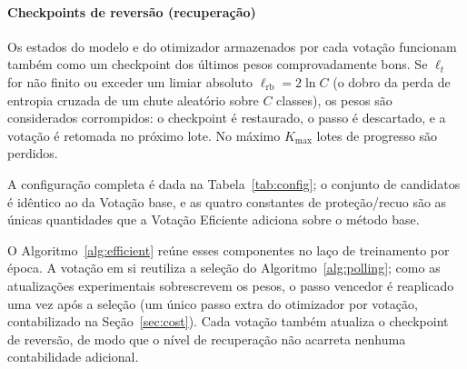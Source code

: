 \documentclass[conference]{IEEEtran}
\begin{document}
\paragraph{Checkpoints de reversão (recuperação)} Os estados do modelo e do otimizador armazenados por cada votação funcionam também como um checkpoint dos últimos pesos comprovadamente bons. Se $\ell_t$ for não finito ou exceder um limiar absoluto $\ell_{\mathrm{rb}} = 2\ln C$ (o dobro da perda de entropia cruzada de um chute aleatório sobre $C$ classes), os pesos são considerados corrompidos: o checkpoint é restaurado, o passo é descartado, e a votação é retomada no próximo lote. No máximo $K_{\max}$ lotes de progresso são perdidos.

A configuração completa é dada na Tabela~\ref{tab:config}; o conjunto de candidatos é idêntico ao da Votação base, e as quatro constantes de proteção/recuo são as únicas quantidades que a Votação Eficiente adiciona sobre o método base.

\begin{table}[htbp]
\caption{Configuração da Votação Eficiente}
\begin{center}
\end{center}
\label{tab:config}
\end{table}

O Algoritmo~\ref{alg:efficient} reúne esses componentes no laço de treinamento por época. A votação em si reutiliza a seleção do Algoritmo~\ref{alg:polling}; como as atualizações experimentais sobrescrevem os pesos, o passo vencedor é reaplicado uma vez após a seleção (um único passo extra do otimizador por votação, contabilizado na Seção~\ref{sec:cost}). Cada votação também atualiza o checkpoint de reversão, de modo que o nível de recuperação não acarreta nenhuma contabilidade adicional.
\end{document}
